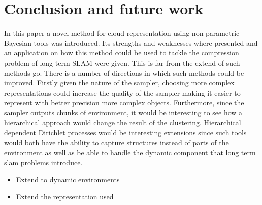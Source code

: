 \documentclass[twoside,hidelinks]{article}
\begin{document}
\section{Conclusion and future work}
\label{sec:discussion}

In this paper a novel method for cloud representation using non-parametric Bayesian tools was introduced. Its strengths and weaknesses where presented and an application on how this method could be used to tackle the compression problem of long term SLAM were given. This is far from the extend of such methods go. There is a number of directions in which such methods could be improved. Firstly given the nature of the sampler, choosing more complex representations could increase the quality of the sampler making it easier to represent with better precision more complex objects. Furthermore, since the sampler outputs chunks of environment, it would be interesting to see how a hierarchical approach would change the result of the clustering. Hierarchical dependent Dirichlet processes would be interesting extensions since such tools would both have the ability to capture structures instead of parts of the environment as well as be able to handle the dynamic component that long term slam problems introduce. 

\begin{itemize}
    \item Extend to dynamic environments
    \item Extend the representation used
\end{itemize}
\end{document}
